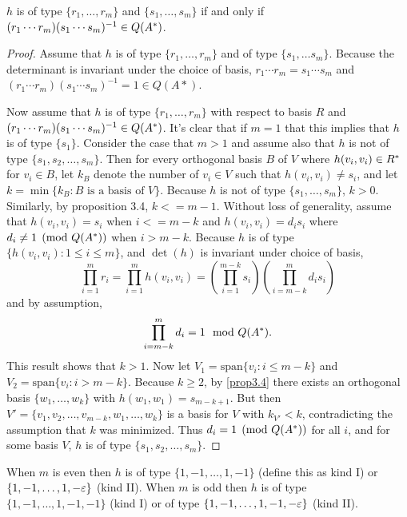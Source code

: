 \begin{lemma}\label{extralemma1}
$h$ is of type $\{r_1, \dotsc, r_m \}$ and $\{s_1, \dotsc, s_m \}$ if and only if \newline $(r_1 \dotsb r_m)(s_1 \dotsb s_m)^{-1} \in Q(A^*)$.
\end{lemma}

\begin{proof}
Assume that $h$ is of type $\{r_1, \dotsc, r_m\}$ and of type $\{s_1, \dotsc s_m \}$. Because the determinant is invariant under the choice of basis, $r_1 \dotsb r_m = s_1 \dotsb s_m$ and $(r_1 \dotsb r_m)(s_1 \dotsb s_m)^{-1} = 1 \in Q(A*)$.

Now assume that $h$ is of type $\{r_1, \dotsc, r_m \}$ with respect to basis $R$ and $(r_1 \dotsb r_m)(s_1 \dotsb s_m)^{-1} \in Q(A^*)$.
It's clear that if $m = 1$ that this implies that $h$ is of type $\{s_1 \}$.
Consider the case that $m > 1$ and assume also that $h$ is not of type $\{s_1, s_2, \dotsc, s_m \}$.
Then for every orthogonal basis $B$ of $V$ where $h(v_i, v_i) \in R^*$ for $v_i \in B$, let $k_B$ denote the number of $v_i \in V$ such that $h(v_i, v_i) \ne s_i$, and let $k = \min \{k_B : B \text{ is a basis of } V \}$.
Because $h$ is not of type $\{s_1, \dotsc, s_m \}$, $k > 0$.
Similarly, by proposition 3.4, $k <= m - 1$.
Without loss of generality, assume that $h(v_i, v_i) = s_i$ when $i <= m - k$ and $h(v_i, v_i) = d_i s_i$ where $d_i \ne 1 \pmod{Q(A^*)}$ when $i > m - k$.
Because $h$ is of type $\{h(v_i,v_i): 1 \le i \le m \}$, and $\det(h)$ is invariant under choice of basis,
\[
\prod_{i=1}^m r_i = \prod_{i=1}^m h(v_i, v_i) = \left(\prod_{i=1}^{m - k} s_i \right) \left( \prod_{i=m - k}^m d_i s_i \right)
\]
and by assumption,
\[
\prod_{i=m-k}^m d_i = 1 \mod{Q(A^*)}.
\]
This result shows that $k > 1$.
Now let $V_1 = \text{span}\{v_i: i \le m - k\}$ and $V_2 = \text{span}\{v_i: i > m - k\}$.
Because $k \ge 2$, by \cref{prop3.4} there exists an orthogonal basis $\{w_1, \dotsc, w_k \}$ with $h(w_1, w_1) = s_{m - k + 1}$.
But then $V' = \{v_1, v_2, \dotsc, v_{m-k}, w_1, \dotsc, w_k \}$ is a basis for $V$ with $k_{V'} < k$, contradicting the assumption that $k$ was minimized.
Thus $d_i = 1 \pmod{Q(A^*)}$ for all $i$, and for some basis $V$, $h$ is of type $\{s_1, s_2, \dotsc, s_m\}$.
\end{proof}

\begin{lemma}\label{extralemma2}
When $m$ is even then $h$ is of type $\{1, -1, \dotsc, 1, -1 \}$ (define this as kind I) or $\{1, -1,\dotsc, 1, -\varepsilon \}$ (kind II).
When $m$ is odd then $h$ is of type $\{1, -1, \dotsc, 1, -1, -1 \}$ (kind I) or of type $\{1, -1, \dotsc, 1, -1, -\varepsilon \}$ (kind II).
\end{lemma}

